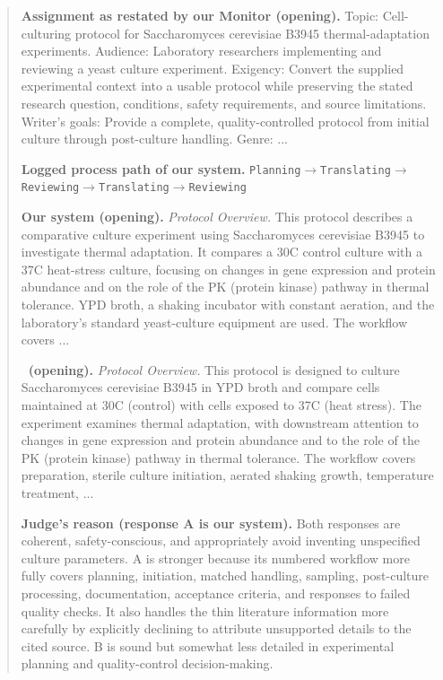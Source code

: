 \begin{quote}
\small
\textbf{Assignment as restated by our Monitor (opening).} Topic: Cell-culturing protocol for Saccharomyces cerevisiae B3945 thermal-adaptation experiments. Audience: Laboratory researchers implementing and reviewing a yeast culture experiment. Exigency: Convert the supplied experimental context into a usable protocol while preserving the stated research question, conditions, safety requirements, and source limitations. Writer's goals: Provide a complete, quality-controlled protocol from initial culture through post-culture handling. Genre: ...

\textbf{Logged process path of our system.} \texttt{Planning}$\rightarrow$\texttt{Translating}$\rightarrow$\texttt{Reviewing}$\rightarrow$\texttt{Translating}$\rightarrow$\texttt{Reviewing}

\textbf{Our system (opening).} \textit{Protocol Overview.} This protocol describes a comparative culture experiment using Saccharomyces cerevisiae B3945 to investigate thermal adaptation. It compares a 30\textdegree{}C control culture with a 37\textdegree{}C heat-stress culture, focusing on changes in gene expression and protein abundance and on the role of the PK (protein kinase) pathway in thermal tolerance. YPD broth, a shaking incubator with constant aeration, and the laboratory's standard yeast-culture equipment are used. The workflow covers ...

\textbf{\condStaged\ (opening).} \textit{Protocol Overview.} This protocol is designed to culture Saccharomyces cerevisiae B3945 in YPD broth and compare cells maintained at 30\textdegree{}C (control) with cells exposed to 37\textdegree{}C (heat stress). The experiment examines thermal adaptation, with downstream attention to changes in gene expression and protein abundance and to the role of the PK (protein kinase) pathway in thermal tolerance. The workflow covers preparation, sterile culture initiation, aerated shaking growth, temperature treatment, ...

\textbf{Judge's reason (response A is our system).} Both responses are coherent, safety-conscious, and appropriately avoid inventing unspecified culture parameters. A is stronger because its numbered workflow more fully covers planning, initiation, matched handling, sampling, post-culture processing, documentation, acceptance criteria, and responses to failed quality checks. It also handles the thin literature information more carefully by explicitly declining to attribute unsupported details to the cited source. B is sound but somewhat less detailed in experimental planning and quality-control decision-making.
\end{quote}
